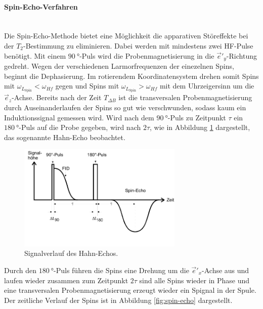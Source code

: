 \paragraph{Spin-Echo-Verfahren}\\
Die Spin-Echo-Methode bietet eine Möglichkeit die apparativen Störeffekte
bei der $T_2$-Bestimmung zu eliminieren.
Dabei werden mit mindestens zwei HF-Pulse benötigt.
Mit einem $\SI{90}{\degree}$-Puls wird die Probenmagnetisierung in die
$\vec{e}'_y$-Richtung gedreht.
Wegen der verschiedenen Larmorfrequenzen der einezelnen Spins, beginnt die Dephasierung.
Im rotierendem Koordinatensystem drehen somit Spins mit $\omega_{L_\text{Spin}}<\omega_{Hf}$
gegen und Spins mit $\omega_{L_\text{Spin}}>\omega_{Hf}$ mit dem
Uhrzeigersinn um die $\vec{e}_z$-Achse.
Bereits nach der Zeit $T_{\Delta B}$ ist die transversalen
Probenmagnetisierung durch
Auseinanderlaufen der Spins so gut wie verschwunden,
sodass kaum ein Induktionssignal
gemessen wird. Wird nach dem $\SI{90}{\degree}$-Puls
zu Zeitpunkt $\tau$
ein $\SI{180}{\degree}$-Puls
auf die Probe gegeben, wird nach $2\tau$,
wie in Abbildung \ref{fig:hahn-echo} dargestellt,
das sogenannte Hahn-Echo beobachtet.
\begin{figure}
  \centering
  \includegraphics[width=0.7\textwidth]{hahn-echo.PNG}
  \caption{Signalverlauf des Hahn-Echos.\cite{sample}}
  \label{fig:hahn-echo}
\end{figure}
Durch den $\SI{180}{\degree}$-Puls führen
die Spins eine Drehung um die
$\vec{e}'_x$-Achse aus und laufen wieder zusammen
zum Zeitpunkt $2\tau$ sind alle Spins wieder in Phase und eine
transversalen Probenmagnetisierung
erzeugt wieder ein Spignal in der Spule.
Der zeitliche Verlauf der Spins ist in Abbildung
\ref{fig:spin-echo} dargestellt.
\FloatBarrier

